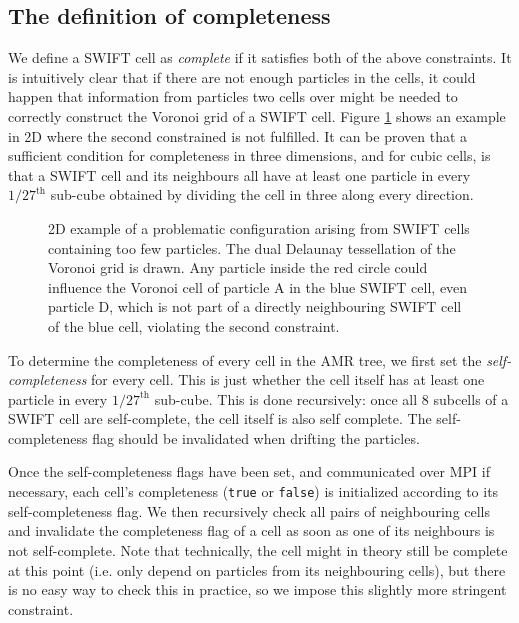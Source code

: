 \subsection{The definition of completeness}
We define a SWIFT cell as \emph{complete} if it satisfies both of the above constraints. 
It is intuitively clear that if there are not enough particles in the cells, it could happen that information from particles two cells over might be needed to correctly construct the Voronoi grid of a SWIFT cell. Figure \ref{fig:problem-completeness} shows an example in 2D where the second constrained is not fulfilled.
It can be proven that a sufficient condition for completeness in three dimensions, and for cubic cells, is that a SWIFT cell and its neighbours all have at least one particle in every $1/27^\text{th}$ sub-cube obtained by dividing the cell in three along every direction.

\begin{figure}
    \centering
    
    \caption{2D example of a problematic configuration arising from SWIFT cells containing too few particles. The dual Delaunay tessellation of the Voronoi grid is drawn. Any particle inside the red circle could influence the Voronoi cell of particle A in the blue SWIFT cell, even particle D, which is not part of a directly neighbouring SWIFT cell of the blue cell, violating the second constraint.}
    \label{fig:problem-completeness}
\end{figure}

To determine the completeness of every cell in the AMR tree, we first set the \emph{self-completeness} for every cell. This is just whether the cell itself has at least one particle in every $1/27^\text{th}$ sub-cube. This is done recursively: once all 8 subcells of a SWIFT cell are self-complete, the cell itself is also self complete.
The self-completeness flag should be invalidated when drifting the particles.

Once the self-completeness flags have been set, and communicated over MPI if necessary, each cell's completeness (\texttt{true} or \texttt{false}) is initialized according to its self-completeness flag. We then recursively check all pairs of neighbouring cells and invalidate the completeness flag of a cell as soon as one of its neighbours is not self-complete. Note that technically, the cell might in theory still be complete at this point (i.e. only depend on particles from its neighbouring cells), but there is no easy way to check this in practice, so we impose this slightly more stringent constraint.

